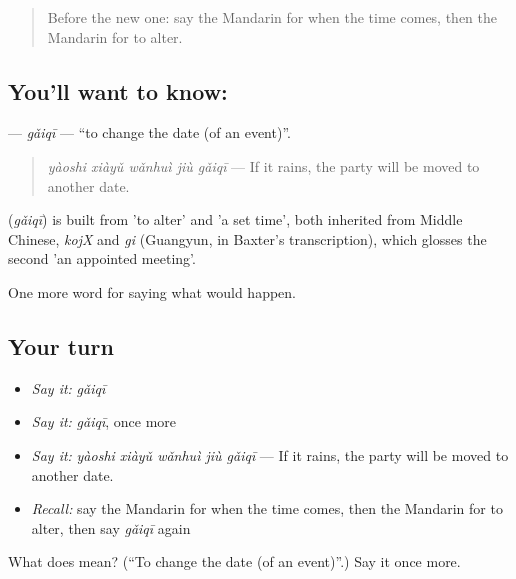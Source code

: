 \label{lesson:ZH-C392-gaiqi}



\begin{quote}
Before the new one: say the Mandarin for when the time comes, then the Mandarin for to alter.
\end{quote}

\subsection*{You'll want to know: }
\textbf{} — \emph{gǎiqī} — \textquotedblleft{}to change the date (of an event)\textquotedblright{}.

\begin{quote}
\textbf{} \emph{yàoshi xiàyǔ wǎnhuì jiù gǎiqī} — If it rains, the party will be moved to another date.
\end{quote}

\begin{cousinweb}
\textbf{} (\emph{gǎiqī}) is built from  'to alter' and  'a set time', both inherited from Middle Chinese, \emph{kojX} and \emph{gi} (Guangyun, in Baxter's transcription), which glosses the second 'an appointed meeting'.
\end{cousinweb}

\begin{grammarlens}[title={What you've built}]
One more word for saying what would happen.
\end{grammarlens}

\subsection*{Your turn}
\begin{itemize}
\raggedright
  \item \emph{Say it:} \emph{gǎiqī}
  \item \emph{Say it:} \emph{gǎiqī}, once more
  \item \emph{Say it:} \emph{yàoshi xiàyǔ wǎnhuì jiù gǎiqī} — If it rains, the party will be moved to another date.
  \item \emph{Recall:} say the Mandarin for when the time comes, then the Mandarin for to alter, then say \emph{gǎiqī} again
\end{itemize}

\begin{tcolorbox}[breakable,colback=teal!4,colframe=teal!35!black,title={Before you move on}]
What does  mean? (\textquotedblleft{}To change the date (of an event)\textquotedblright{}.) Say it once more.
\end{tcolorbox}
